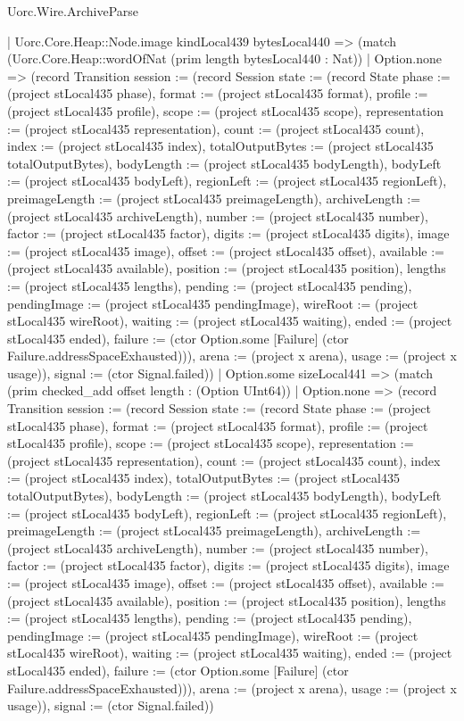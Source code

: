 \begin{lexlean}{Uorc.Wire.ArchiveParse}
\begin{semanticmodule}
{        | Uorc.Core.Heap::Node.image kindLocal439 bytesLocal440 => (match (Uorc.Core.Heap::wordOfNat (prim length bytesLocal440 : Nat))
          | Option.none => (record Transition {session := (record Session {state := (record State {phase := (project stLocal435 phase), format := (project stLocal435 format), profile := (project stLocal435 profile), scope := (project stLocal435 scope), representation := (project stLocal435 representation), count := (project stLocal435 count), index := (project stLocal435 index), totalOutputBytes := (project stLocal435 totalOutputBytes), bodyLength := (project stLocal435 bodyLength), bodyLeft := (project stLocal435 bodyLeft), regionLeft := (project stLocal435 regionLeft), preimageLength := (project stLocal435 preimageLength), archiveLength := (project stLocal435 archiveLength), number := (project stLocal435 number), factor := (project stLocal435 factor), digits := (project stLocal435 digits), image := (project stLocal435 image), offset := (project stLocal435 offset), available := (project stLocal435 available), position := (project stLocal435 position), lengths := (project stLocal435 lengths), pending := (project stLocal435 pending), pendingImage := (project stLocal435 pendingImage), wireRoot := (project stLocal435 wireRoot), waiting := (project stLocal435 waiting), ended := (project stLocal435 ended), failure := (ctor Option.some [Failure] (ctor Failure.addressSpaceExhausted))}), arena := (project x arena), usage := (project x usage)}), signal := (ctor Signal.failed)})
          | Option.some sizeLocal441 => (match (prim checked_add offset length : (Option UInt64))
            | Option.none => (record Transition {session := (record Session {state := (record State {phase := (project stLocal435 phase), format := (project stLocal435 format), profile := (project stLocal435 profile), scope := (project stLocal435 scope), representation := (project stLocal435 representation), count := (project stLocal435 count), index := (project stLocal435 index), totalOutputBytes := (project stLocal435 totalOutputBytes), bodyLength := (project stLocal435 bodyLength), bodyLeft := (project stLocal435 bodyLeft), regionLeft := (project stLocal435 regionLeft), preimageLength := (project stLocal435 preimageLength), archiveLength := (project stLocal435 archiveLength), number := (project stLocal435 number), factor := (project stLocal435 factor), digits := (project stLocal435 digits), image := (project stLocal435 image), offset := (project stLocal435 offset), available := (project stLocal435 available), position := (project stLocal435 position), lengths := (project stLocal435 lengths), pending := (project stLocal435 pending), pendingImage := (project stLocal435 pendingImage), wireRoot := (project stLocal435 wireRoot), waiting := (project stLocal435 waiting), ended := (project stLocal435 ended), failure := (ctor Option.some [Failure] (ctor Failure.addressSpaceExhausted))}), arena := (project x arena), usage := (project x usage)}), signal := (ctor Signal.failed)})
}
\end{semanticmodule}
\end{lexlean}
